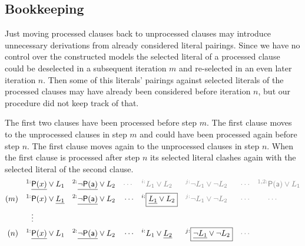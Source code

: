 \subsection{Bookkeeping}\label{sec:selected:literals:bookkeeping}

Just moving processed clauses back to unprocessed clauses may introduce unnecessary derivations from already considered literal pairings.
Since we have no control over the constructed models
the selected literal of a processed clause
could be deselected in a subsequent iteration \( m \)
and re-selected in an even later iteration \( n \).
Then some of this literals' pairings against
selected literals of the processed clauses
may have already been considered before iteration \( n \),
but our procedure did not keep track of that.

\begin{example}[InstGen]
	The first two clauses have been processed before step \( m \).
	The first clause moves to the unprocessed clauses in step \( m \)
	and could have been processed again before step \( n \).
	The first clause moves again to the unprocessed clauses in step \( n \).
When the first clause is processed after step \(n \)
its selected literal clashes again with the selected literal of
the second clause.
\begin{align*}
	^{1:}&\underline{\mP(x)}\lor L_1
	&^{2:}&\underline{\lnot\mP(\ma)}\lor L_2
	&&\textcolor{colG}{\cdots}
	&\textcolor{colG}{^{i:}}&\textcolor{colG}{L_1\lor L_2}
	&\textcolor{colG}{^{j:}}&\textcolor{colG}{\lnot L_1\lor\lnot L_2}
	&&\textcolor{colG}{\cdots}
	&\textcolor{colG}{^{1,2:}}&\textcolor{colG}{\mP(\ma)\lor L_1}
	\\
	(m)\quad
	^{1:}&\mP(x)\lor \underline{L_1}
	&^{2:}&\underline{\lnot\mP(\ma)}\lor L_2
	&&\cdots
	&^{i:}&\boxed{\underline{L_1}\lor L_2}
	&\textcolor{colG}{^{j:}}&\textcolor{colG}{\lnot L_1\lor\lnot L_2}
	&&\textcolor{colG}{\cdots}
	&&\textcolor{colG}{\cdots}
	\\
	&\vdots
	\\
	(n)\quad
	^{1:}&\underline{\mP(x)}\lor {L_1} &
	^{2:}&\underline{\lnot\mP(\ma)}\lor L_2 &
	&\cdots&
	^{i:}&{L_1}\lor \underline{L_2} &
	^{j:}&\boxed{\underline{\lnot L_1}\lor \lnot L_2} &
	&\textcolor{colG}{\cdots}
\end{align*}
\end{example}

\begin{procedure}
\end{procedure}



